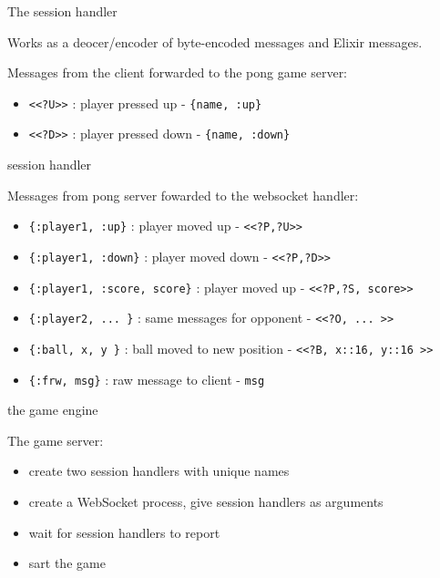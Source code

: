 \begin{frame}{The session handler}

  Works as a deocer/encoder of byte-encoded  messages and Elixir messages.

  \vspace{20pt}  \pause

  Messages from the client forwarded to the pong game server:

  \vspace{20pt}

  \begin{itemize}
  \item {\tt <<?U>>}  : player pressed up -  {\tt \{name, :up\}}
  \item {\tt <<?D>>}  : player pressed down -  {\tt \{name, :down\}}        
  \end{itemize}


\end{frame}

\begin{frame}{session handler}

  Messages from pong server fowarded to the websocket handler:

  \vspace{20pt}
      
  \begin{itemize}
  \item {\tt \{:player1, :up\}}  : player moved up -  {\tt <<?P,?U>>}
  \item {\tt \{:player1, :down\}}  : player moved down - {\tt <<?P,?D>>}
  \item {\tt \{:player1, :score, score\}}  : player moved up - {\tt <<?P,?S, score>>}
  \item {\tt \{:player2, ... \}} : same messages for opponent -  {\tt <<?O, ... >>}        
  \item {\tt \{:ball, x, y \}} : ball moved to new position - {\tt <<?B, x::16, y::16 >>}        
  \item {\tt \{:frw, msg\}}  : raw message to client - {\tt msg}
  \end{itemize}
\end{frame}

\begin{frame}{the game engine}

  The game server:
  \vspace{10pt} \pause
  \begin{itemize}
  \item create two session handlers with unique names \pause
  \item create a WebSocket process, give session handlers as arguments \pause
  \item wait for session handlers to report \pause
  \item sart the game \pause
  \end{itemize}
  
\end{frame}


